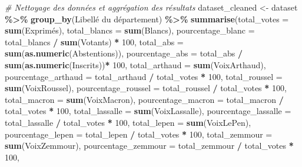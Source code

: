 \documentclass[
]{article}
\newenvironment{Shaded}{\begin{snugshade}}{\end{snugshade}}
\newcommand{\AttributeTok}[1]{\textcolor[rgb]{0.13,0.29,0.53}{#1}}
\newcommand{\CommentTok}[1]{\textcolor[rgb]{0.56,0.35,0.01}{\textit{#1}}}
\newcommand{\DecValTok}[1]{\textcolor[rgb]{0.00,0.00,0.81}{#1}}
\newcommand{\FunctionTok}[1]{\textcolor[rgb]{0.13,0.29,0.53}{\textbf{#1}}}
\newcommand{\NormalTok}[1]{#1}
\newcommand{\OtherTok}[1]{\textcolor[rgb]{0.56,0.35,0.01}{#1}}
\newcommand{\SpecialCharTok}[1]{\textcolor[rgb]{0.81,0.36,0.00}{\textbf{#1}}}
\newcommand{\StringTok}[1]{\textcolor[rgb]{0.31,0.60,0.02}{#1}}
\begin{document}
\begin{Shaded}
\begin{Highlighting}[]
\CommentTok{\# Nettoyage des données et aggrégation des résultats}
\NormalTok{dataset\_cleaned }\OtherTok{\textless{}{-}}\NormalTok{ dataset }\SpecialCharTok{\%\textgreater{}\%}
  \FunctionTok{group\_by}\NormalTok{(}\StringTok{\textasciigrave{}}\AttributeTok{Libellé du département}\StringTok{\textasciigrave{}}\NormalTok{) }\SpecialCharTok{\%\textgreater{}\%}
  \FunctionTok{summarise}\NormalTok{(}\AttributeTok{total\_votes =} \FunctionTok{sum}\NormalTok{(Exprimés), }
            \AttributeTok{total\_blancs =} \FunctionTok{sum}\NormalTok{(Blancs),}
            \AttributeTok{pourcentage\_blanc =}\NormalTok{ total\_blancs }\SpecialCharTok{/} \FunctionTok{sum}\NormalTok{(Votants) }\SpecialCharTok{*} \DecValTok{100}\NormalTok{, }
            \AttributeTok{total\_abs =} \FunctionTok{sum}\NormalTok{(}\FunctionTok{as.numeric}\NormalTok{(Abstentions)), }
            \AttributeTok{pourcentage\_abs =}\NormalTok{ total\_abs }\SpecialCharTok{/} \FunctionTok{sum}\NormalTok{(}\FunctionTok{as.numeric}\NormalTok{(Inscrits))}\SpecialCharTok{*} \DecValTok{100}\NormalTok{,}
            \AttributeTok{total\_arthaud =} \FunctionTok{sum}\NormalTok{(VoixArthaud), }
            \AttributeTok{pourcentage\_arthaud =}\NormalTok{ total\_arthaud }\SpecialCharTok{/}\NormalTok{ total\_votes }\SpecialCharTok{*} \DecValTok{100}\NormalTok{,}
            \AttributeTok{total\_roussel =} \FunctionTok{sum}\NormalTok{(VoixRoussel),}
            \AttributeTok{pourcentage\_roussel =}\NormalTok{ total\_roussel }\SpecialCharTok{/}\NormalTok{ total\_votes }\SpecialCharTok{*} \DecValTok{100}\NormalTok{,}
            \AttributeTok{total\_macron =} \FunctionTok{sum}\NormalTok{(VoixMacron),}
            \AttributeTok{pourcentage\_macron =}\NormalTok{ total\_macron }\SpecialCharTok{/}\NormalTok{ total\_votes }\SpecialCharTok{*} \DecValTok{100}\NormalTok{,}
            \AttributeTok{total\_lassalle =} \FunctionTok{sum}\NormalTok{(VoixLassalle),}
            \AttributeTok{pourcentage\_lassalle =}\NormalTok{ total\_lassalle }\SpecialCharTok{/}\NormalTok{ total\_votes }\SpecialCharTok{*} \DecValTok{100}\NormalTok{,}
            \AttributeTok{total\_lepen =} \FunctionTok{sum}\NormalTok{(VoixLePen),}
            \AttributeTok{pourcentage\_lepen =}\NormalTok{ total\_lepen }\SpecialCharTok{/}\NormalTok{ total\_votes }\SpecialCharTok{*} \DecValTok{100}\NormalTok{,}
            \AttributeTok{total\_zemmour =} \FunctionTok{sum}\NormalTok{(VoixZemmour),}
            \AttributeTok{pourcentage\_zemmour =}\NormalTok{ total\_zemmour }\SpecialCharTok{/}\NormalTok{ total\_votes }\SpecialCharTok{*} \DecValTok{100}\NormalTok{,}

\end{Highlighting}
\end{Shaded}
\end{document}
